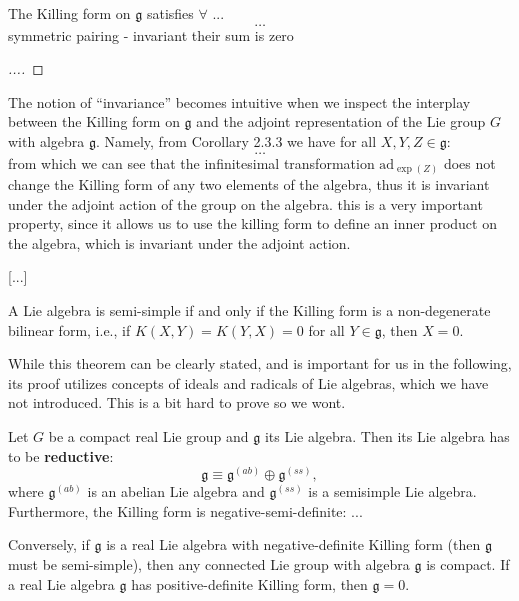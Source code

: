 \begin{proposition}
    The Killing form on \(\mathfrak{g}\) satisfies \(\forall\) ...
    \[
        \dots
    \]
    symmetric pairing - invariant
    their sum is zero
\end{proposition}
\begin{proof}
    [...]
\end{proof}

The notion of “invariance” becomes intuitive when we inspect the interplay between the Killing form on \(\mathfrak{g}\) and the adjoint representation of the Lie group \(G\) with algebra \(\mathfrak{g}\). Namely, from Corollary 2.3.3 we have for all \(X,Y,Z \in \mathfrak{g}\):
\[
    \dots
\]
from which we can see that the infinitesimal transformation \(\mathrm{ad}_{\exp(Z)}\) does not change the Killing form of any two elements of the algebra, thus it is invariant under the adjoint action of the group on the algebra. this is a very important property, since it allows us to use the killing form to define an inner product on the algebra, which is invariant under the adjoint action.

\begin{example}[...]
    [...]
\end{example}

[...]

\begin{theorem}
    A Lie algebra is semi-simple if and only if the Killing form is a non-degenerate bilinear form, i.e., if \(K(X,Y)=K(Y,X)=0\)  for all \(Y \in \mathfrak{g}\), then \(X = 0\).
\end{theorem}

While this theorem can be clearly stated, and is important for us in the following, its proof utilizes concepts of ideals and radicals of Lie algebras, which we have not introduced. This is a bit hard to prove so we wont.

\begin{theorem}
    Let \(G\) be a compact real Lie group and \(\mathfrak{g}\) its Lie algebra. Then its Lie algebra has to be \textbf{reductive}:
    \[
        \mathfrak{g} \equiv \mathfrak{g}^{(ab)} \oplus \mathfrak{g}^{(ss)},
    \]
    where \(\mathfrak{g}^{(ab)}\) is an abelian Lie algebra and \(\mathfrak{g}^{(ss)}\) is a semisimple Lie algebra. Furthermore, the Killing form is negative-semi-definite: ...

    Conversely, if \(\mathfrak{g}\) is a real Lie algebra with negative-definite Killing form (then \(\mathfrak{g}\) must be semi-simple), then any connected Lie group with algebra \(\mathfrak{g}\) is compact. If a real Lie algebra \(\mathfrak{g}\) has positive-definite Killing form, then \(\mathfrak{g} = {0}\).
\end{theorem}

